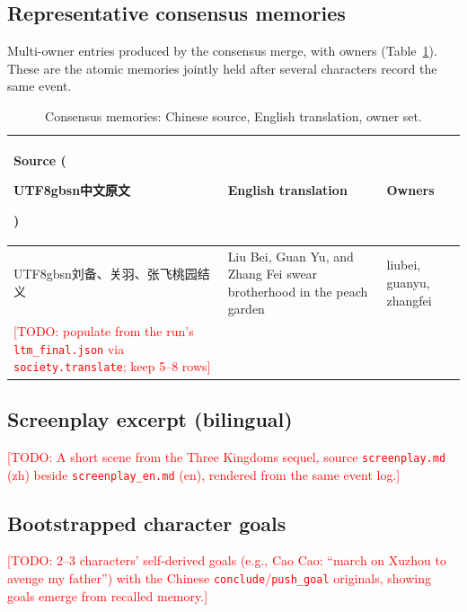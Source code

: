 \documentclass[11pt]{article}
\newcommand{\todo}[1]{\textcolor{red}{[TODO: #1]}}
\begin{document}
\subsection{Representative consensus memories}
\label{app:consensus}
Multi-owner entries produced by the consensus merge, with owners
(Table~\ref{tab:app-mem}). These are the atomic memories jointly held after
several characters record the same event.
\begin{table}[h]
\centering\small
\begin{tabular}{p{4.2cm}p{4.6cm}p{3.2cm}}
\toprule
Source (\begin{CJK}{UTF8}{gbsn}中文原文\end{CJK}) & English translation & Owners \\
\midrule
\begin{CJK}{UTF8}{gbsn}刘备、关羽、张飞桃园结义\end{CJK} &
Liu Bei, Guan Yu, and Zhang Fei swear brotherhood in the peach garden &
liubei, guanyu, zhangfei \\
\todo{populate from the run's \texttt{ltm\_final.json} via
\texttt{society.translate}; keep 5--8 rows} & & \\
\bottomrule
\end{tabular}
\caption{Consensus memories: Chinese source, English translation, owner set.}
\label{tab:app-mem}
\end{table}

\subsection{Screenplay excerpt (bilingual)}
\label{app:screenplay}
\todo{A short scene from the Three Kingdoms sequel, source \texttt{screenplay.md}
(zh) beside \texttt{screenplay\_en.md} (en), rendered from the same event log.}

\subsection{Bootstrapped character goals}
\label{app:goals}
\todo{2--3 characters' self-derived goals (e.g., Cao Cao: ``march on Xuzhou to
avenge my father'') with the Chinese \texttt{conclude}/\texttt{push\_goal}
originals, showing goals emerge from recalled memory.}
\end{document}
